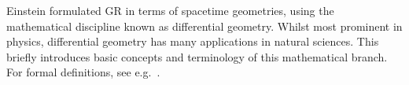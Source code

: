 





\newcommand\Chr{\ChristoffelSym}
\newcommand*\Kd{\Krondelta}
\newcommand*\Ric{\RicciScalar}
\newcommand\cfac{\Upsilon}
\newcommand\wt{\widetilde}
\newcommand\hypacc{\ALIAShypacc}













Einstein formulated GR in terms of spacetime geometries, using the mathematical discipline known as differential geometry. 
Whilst most prominent in physics, differential geometry has many applications in natural sciences. This~ briefly introduces basic concepts and terminology of this mathematical branch. For formal definitions, see e.g.~\citet{carrollSpacetimeGeometryIntroduction2019}.


